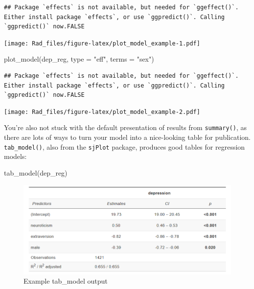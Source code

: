 \documentclass[
]{book}
\newenvironment{Shaded}{\begin{snugshade}}{\end{snugshade}}
\newcommand{\AttributeTok}[1]{\textcolor[rgb]{0.77,0.63,0.00}{#1}}
\newcommand{\FunctionTok}[1]{\textcolor[rgb]{0.00,0.00,0.00}{#1}}
\newcommand{\NormalTok}[1]{#1}
\newcommand{\StringTok}[1]{\textcolor[rgb]{0.31,0.60,0.02}{#1}}
\begin{document}
\begin{verbatim}
## Package `effects` is not available, but needed for `ggeffect()`. Either install package `effects`, or use `ggpredict()`. Calling `ggpredict()` now.FALSE
\end{verbatim}

\texttt{[image: Rad\_files/figure-latex/plot\_model\_example-1.pdf]}

\begin{Shaded}
\begin{Highlighting}[]
\FunctionTok{plot\_model}\NormalTok{(dep\_reg, }
           \AttributeTok{type =} \StringTok{"eff"}\NormalTok{,}
           \AttributeTok{terms =} \StringTok{"sex"}\NormalTok{)}
\end{Highlighting}
\end{Shaded}

\begin{verbatim}
## Package `effects` is not available, but needed for `ggeffect()`. Either install package `effects`, or use `ggpredict()`. Calling `ggpredict()` now.FALSE
\end{verbatim}

\texttt{[image: Rad\_files/figure-latex/plot\_model\_example-2.pdf]}

You're also not stuck with the default presentation
of results from \texttt{summary()}, as there are lots of ways
to turn your model into a nice-looking table for publication.
\texttt{tab\_model()}, also from the \texttt{sjPlot} package, produces
good tables for regression models:

\begin{Shaded}
\begin{Highlighting}[]
\FunctionTok{tab\_model}\NormalTok{(dep\_reg)}
\end{Highlighting}
\end{Shaded}

\begin{figure}
\centering
\includegraphics{Images/tab_model.png}
\caption{Example tab\_model output}
\end{figure}
\end{document}
